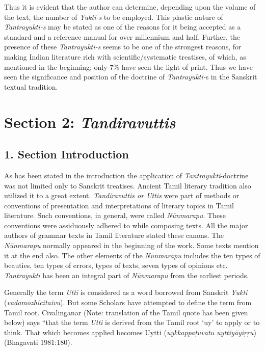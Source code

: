 Thus it is evident that the author can determine, depending upon the volume of the text, the number of \textit{Yukti-s} to be employed. This plastic nature of \textit{Tantrayukti-s} may be stated as one of the reasons for it being accepted as a standard and a reference manual for over millennium and half. Further, the presence of these \textit{Tantrayukti-s} seems to be one of the strongest reasons, for making Indian literature rich with scientific/systematic treatises, of which, as mentioned in the beginning; only 7\% have seen the light of print. Thus we have seen the significance and position of the doctrine of \textit{Tantrayukti-}s in the Sanskrit textual tradition.



\section*{Section 2: \textit{Tandiravuttis}}

\subsection*{1. Section Introduction}

As has been stated in the introduction the application of \textit{Tantrayukti}-doctrine was not limited only to Sanskrit treatises. Ancient Tamil literary tradition also utilized it to a great extent. \textit{Tandiravuttis or Uttis} were part of methods or conventions of presentation and interpretations of literary topics in Tamil literature. Such conventions, in general, were called \textit{Nūnmarapu}. These conventions were assiduously adhered to while composing texts. All the major authors of grammar texts in Tamil literature stated these canons. The \textit{Nūnmarapu} normally appeared in the beginning of the work. Some texts mention it at the end also. The other elements of the \textit{Nūnmarapu} includes the ten types of beauties, ten types of errors, types of texts, seven types of opinions etc. \textit{Tantrayukti} has been an integral part of \textit{Nūnmarapu} from the earliest periods.

Generally the term \textit{Utti} is considered as a word borrowed from Sanskrit \textit{Yukti} (\textit{vadamozhicitaivu}). But some Scholars have attempted to define the term from Tamil root. Civalinganar (Note: translation of the Tamil quote has been given below) says “that the term \textit{Utti} is derived from the Tamil root ‘uy’ to apply or to think. That which becomes applied becomes Uytti (\textit{uykkappaṭuvatu uyttiyāyiṛṛu})\hfill (Bhagavati 1981:180).

